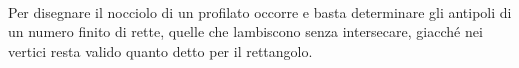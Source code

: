 \begin{figure}[ht]
\centering
{} \quad
{} \\
 \quad
{}
\caption{}
\label{figura6-9}
\end{figure}
Per disegnare il nocciolo di un profilato occorre e basta determinare gli antipoli di un numero finito di rette, quelle che lambiscono senza intersecare, giacché nei vertici resta valido quanto detto per il rettangolo.

